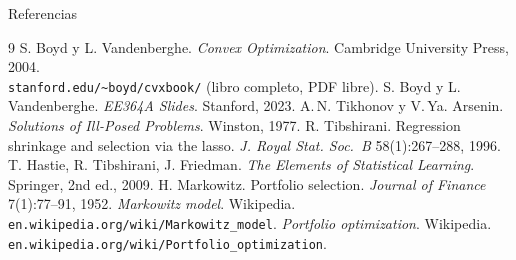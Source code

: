 \documentclass[10pt,aspectratio=169]{beamer}
\newcommand{\0}{\mathbf{0}}
\newcommand{\1}{\mathbf{1}}
\begin{document}
\begin{frame}{Referencias}
  \begin{thebibliography}{9}
     S. Boyd y L. Vandenberghe.
      \emph{Convex Optimization}. Cambridge University Press, 2004.\\
      \texttt{stanford.edu/\~{}boyd/cvxbook/} (libro completo, PDF libre).
     S. Boyd y L. Vandenberghe.
      \emph{EE364A Slides}. Stanford, 2023.
     A.\,N. Tikhonov y V.\,Ya. Arsenin.
      \emph{Solutions of Ill-Posed Problems}. Winston, 1977.
     R. Tibshirani.
      Regression shrinkage and selection via the lasso.
      \emph{J. Royal Stat. Soc.\ B} 58(1):267--288, 1996.
     T. Hastie, R. Tibshirani, J. Friedman.
      \emph{The Elements of Statistical Learning}. Springer, 2nd ed., 2009.
     H. Markowitz.
      Portfolio selection.
      \emph{Journal of Finance} 7(1):77--91, 1952.
     \emph{Markowitz model}. Wikipedia.\\
      \texttt{en.wikipedia.org/wiki/Markowitz\_model}.
     \emph{Portfolio optimization}. Wikipedia.\\
      \texttt{en.wikipedia.org/wiki/Portfolio\_optimization}.
  \end{thebibliography}
\end{frame}
\end{document}
